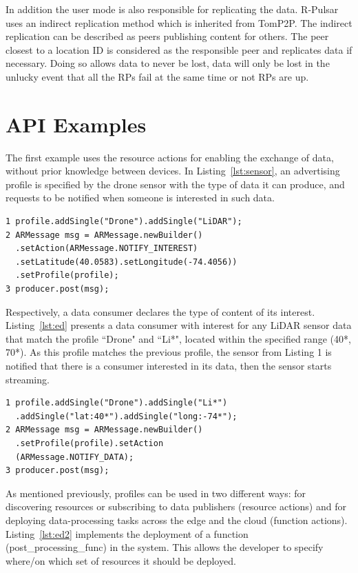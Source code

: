 In addition the user mode is also responsible for replicating the data. R-Pulsar uses an indirect replication method which is inherited from TomP2P. The indirect replication can be described as peers publishing content for others. The peer closest to a location ID is considered as the responsible peer and replicates data if necessary. Doing so allows data to never be lost, data will only be lost in the unlucky event that all the RPs fail at the same time or not RPs are up.

\section{API Examples}

The first example uses the resource actions for enabling the exchange of data, without prior knowledge between devices. In Listing~\ref{lst:sensor}, an advertising profile is specified by the drone sensor with the type of data it can produce, and requests to be notified when someone is interested in such data.

\begin{lstlisting}[language=mylang, caption={Data producer resource profile sample code.}, captionpos=b, label={lst:sensor}]
1 profile.addSingle("Drone").addSingle("LiDAR");
2 ARMessage msg = ARMessage.newBuilder()
  .setAction(ARMessage.NOTIFY_INTEREST)
  .setLatitude(40.0583).setLongitude(-74.4056))
  .setProfile(profile);
3 producer.post(msg);
\end{lstlisting}

Respectively, a data consumer declares the type of content of its interest. Listing~\ref{lst:ed} presents a data consumer with interest for any LiDAR sensor data that match the profile ``Drone" and ``Li*", located within the specified range (40*, 70*). As this profile matches the previous profile, the sensor from Listing 1 is notified that there is a consumer interested in its data, then the sensor starts streaming.

\begin{lstlisting}[language=mylang, caption={Data consumer resource profile sample code.}, captionpos=b, label={lst:ed}]
1 profile.addSingle("Drone").addSingle("Li*")
  .addSingle("lat:40*").addSingle("long:-74*");
2 ARMessage msg = ARMessage.newBuilder()
  .setProfile(profile).setAction
  (ARMessage.NOTIFY_DATA);
3 producer.post(msg);
\end{lstlisting}

As mentioned previously, profiles can be used in two different ways: for discovering resources or subscribing to data publishers (resource actions) and for deploying data-processing tasks across the edge and the cloud (function actions). Listing~\ref{lst:ed2} implements the deployment of a function (post\_processing\_func) in the system. This allows the developer to specify where/on which set of resources it should be deployed.

